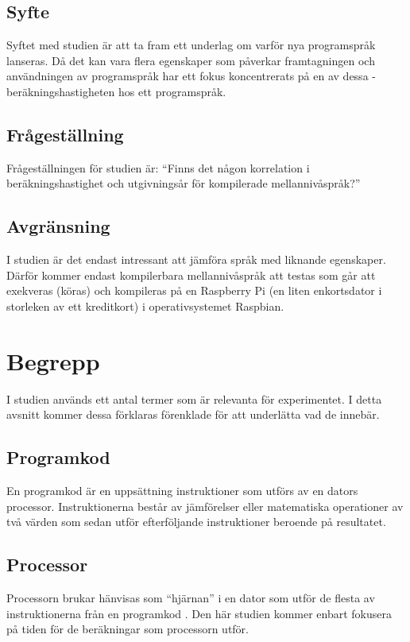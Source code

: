 \documentclass[12pt,swedish]{article}
\begin{document}
\subsection{Syfte}
Syftet med studien är att ta fram ett underlag om varför nya programspråk lanseras. Då det kan vara flera egenskaper som påverkar framtagningen och användningen av programspråk har ett fokus koncentrerats på en av dessa - beräkningshastigheten hos ett programspråk.

\subsection{Frågeställning}
Frågeställningen för studien är: “Finns det någon korrelation i beräkningshastighet och utgivningsår för kompilerade mellannivåspråk?”

\subsection{Avgränsning}
I studien är det endast intressant att jämföra språk med liknande egenskaper. Därför kommer endast kompilerbara mellannivåspråk att testas som går att exekveras (köras) och kompileras på en Raspberry Pi (en liten enkortsdator i storleken av ett kreditkort) i operativsystemet Raspbian.


\section{Begrepp}
I studien används ett antal termer som är relevanta för experimentet. I detta avsnitt kommer dessa förklaras förenklade för att underlätta vad de innebär.

\subsection{Programkod}
En programkod är en uppsättning instruktioner som utförs av en dators processor. Instruktionerna består av jämförelser eller matematiska operationer av två värden som sedan utför efterföljande instruktioner beroende på resultatet.

\subsection{Processor}
Processorn brukar hänvisas som “hjärnan” i en dator som utför de flesta av instruktionerna från en programkod \citep{charuba_1996}. Den här studien kommer enbart fokusera på tiden för de beräkningar som processorn utför.
\end{document}
